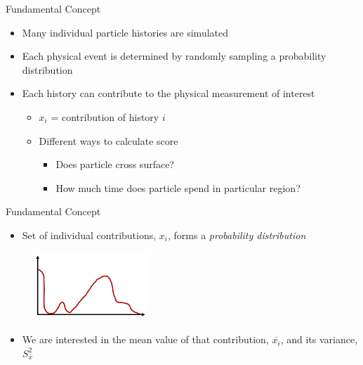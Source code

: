 \documentclass[xcolor=x11names,compress]{beamer}
\renewcommand{\(}{\begin{columns}}
\renewcommand{\)}{\end{columns}}
\newcommand{\<}[1]{\begin{column}{#1}}
\renewcommand{\>}{\end{column}}
\begin{document}
\begin{frame}{Fundamental Concept}

\begin{itemize}
  \item Many individual particle histories are simulated
  \item Each physical event is determined by
randomly sampling a \alert{probability distribution}
  \item Each history can contribute to the physical
measurement of interest
    \begin{itemize}
    \item $x_i$ = contribution of history $i$
    \item Different ways to calculate score
      \begin{itemize}
      \item Does particle cross surface?
      \item How much time does particle spend in particular region?
      \end{itemize}
    \end{itemize}
\end{itemize}
\end{frame}


\begin{frame}{Fundamental Concept}

\begin{itemize}
  \item Set of individual contributions, ${x_i}$,
forms a \textit{probability distribution}
\end{itemize}
  	\begin{figure}
  	\begin{center}
  		\includegraphics[height=1in,clip]{pdf}
	\end{center}
  	\end{figure}

\begin{itemize}
  \item We are interested in the mean value of that contribution, $\overline{x_i}$, and its variance, $S_{\overline{x}}^2$
\end{itemize}

\end{frame}
\end{document}
